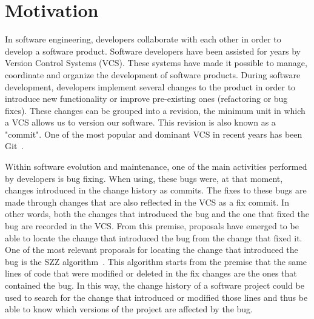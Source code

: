 \section{Motivation}

In software engineering, developers collaborate with each other in order to develop a software product. 
Software developers have been assisted for years by Version Control Systems (VCS). 
These systems have made it possible to manage, coordinate and organize the development of software products. 
During software development, developers implement several changes to the product in order to introduce new functionality or improve pre-existing ones (refactoring or bug fixes). 
These changes can be grouped into a revision, the minimum unit in which a VCS allows us to version our software. This revision is also known as a "commit". 
One of the most popular and dominant VCS in recent years has been Git~\cite{VersionControlSystemSurvey:2022:Online}.

Within software evolution and maintenance, one of the main activities performed by developers is bug fixing. 
When using, these bugs were, at that moment, changes introduced in the change history as commits. 
The fixes to these bugs are made through changes that are also reflected in the VCS as a fix commit. 
In other words, both the changes that introduced the bug and the one that fixed the bug are recorded in the VCS. 
From this premise, proposals have emerged to be able to locate the change that introduced the bug from the change that fixed it. 
One of the most relevant proposals for locating the change that introduced the bug is the SZZ algorithm~\cite{Sliwerski:2005:CIF:1083142.1083147}. 
This algorithm starts from the premise that the same lines of code that were modified or deleted in the fix changes are the ones that contained the bug. 
In this way, the change history of a software project could be used to search for the change that introduced or modified those lines and thus be able to know which versions of the project are affected by the bug.


